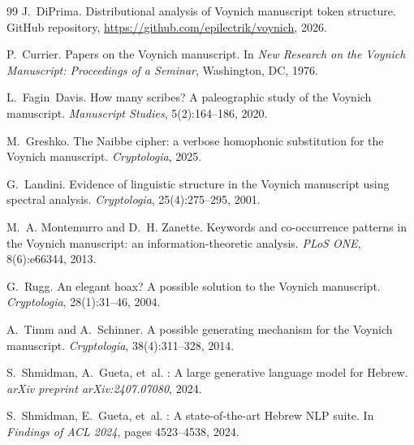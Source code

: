 \documentclass[11pt,a4paper]{article}
\begin{document}
\begin{thebibliography}{99}
J.~DiPrima.
\newblock Distributional analysis of {V}oynich manuscript token structure.
\newblock GitHub repository, \url{https://github.com/epilectrik/voynich}, 2026.

P.~Currier.
\newblock Papers on the {V}oynich manuscript.
\newblock In \emph{New Research on the Voynich Manuscript: Proceedings of a
Seminar}, Washington, DC, 1976.

L.~Fagin~Davis.
\newblock How many scribes? {A} paleographic study of the {V}oynich manuscript.
\newblock \emph{Manuscript Studies}, 5(2):164--186, 2020.

M.~Greshko.
\newblock The {N}aibbe cipher: a verbose homophonic substitution for the
{V}oynich manuscript.
\newblock \emph{Cryptologia}, 2025.

G.~Landini.
\newblock Evidence of linguistic structure in the {V}oynich manuscript using
spectral analysis.
\newblock \emph{Cryptologia}, 25(4):275--295, 2001.

M.~A. Montemurro and D.~H. Zanette.
\newblock Keywords and co-occurrence patterns in the {V}oynich manuscript: an
information-theoretic analysis.
\newblock \emph{PLoS ONE}, 8(6):e66344, 2013.

G.~Rugg.
\newblock An elegant hoax? {A} possible solution to the {V}oynich manuscript.
\newblock \emph{Cryptologia}, 28(1):31--46, 2004.

A.~Timm and A.~Schinner.
\newblock A possible generating mechanism for the {V}oynich manuscript.
\newblock \emph{Cryptologia}, 38(4):311--328, 2014.

S.~Shmidman, A.~Gueta, et~al.
: A large generative language model for {H}ebrew.
\newblock \emph{arXiv preprint arXiv:2407.07080}, 2024.

S.~Shmidman, E.~Gueta, et~al.
: A state-of-the-art {H}ebrew {NLP} suite.
\newblock In \emph{Findings of ACL 2024}, pages 4523--4538, 2024.

\end{thebibliography}
\end{document}
